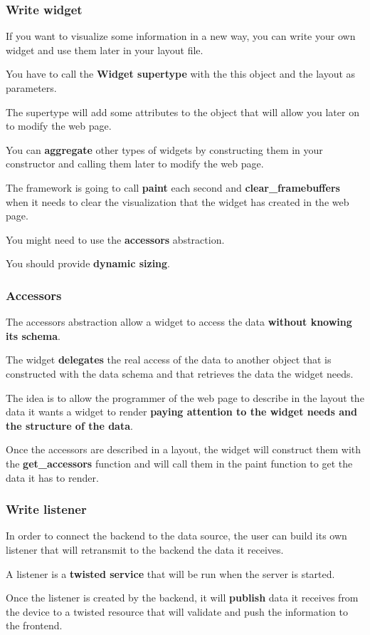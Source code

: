 \documentclass{beamer}
\begin{document}
    \begin{frame}
        \frametitle{Write widget}
        If you want to visualize some information in a new way, you can write
        your own widget and use them later in your layout file.

        You have to call the \textbf{Widget supertype} with the this object and
        the layout as parameters.

        The supertype will add some attributes to the object that will allow you
        later on to modify the web page.

        You can \textbf{aggregate} other types of widgets by constructing them
        in your constructor and calling them later to modify the web page.

        The framework is going to call \textbf{paint} each second and
        \textbf{clear\_framebuffers} when it needs to clear the visualization
        that the widget has created in the web page.

        You might need to use the \textbf{accessors} abstraction.

        You should provide \textbf{dynamic sizing}.
    \end{frame}

    \begin{frame}
        \frametitle{Accessors}
        The accessors abstraction allow a widget to access the data
        \textbf{without knowing its schema}.

        The widget \textbf{delegates} the real access of the data to another
        object that is constructed with the data schema and that retrieves the
        data the widget needs.

        The idea is to allow the programmer of the web page to describe in the
        layout the data it wants a widget to render \textbf{paying attention to
        the widget needs and the structure of the data}.

        Once the accessors are described in a layout, the widget will construct
        them with the \textbf{get\_accessors} function and will call them in the
        paint function to get the data it has to render.
    \end{frame}

    \begin{frame}
        \frametitle{Write listener}
        In order to connect the backend to the data source, the user can
        build its own listener that will retransmit to the backend the data
        it receives.
        
        A listener is a \textbf{twisted service} that will be run when the
        server is started.

        Once the listener is created by the backend, it will \textbf{publish}
        data it receives from the device to a twisted resource that will
        validate and push the information to the frontend.
    \end{frame}
\end{document}
